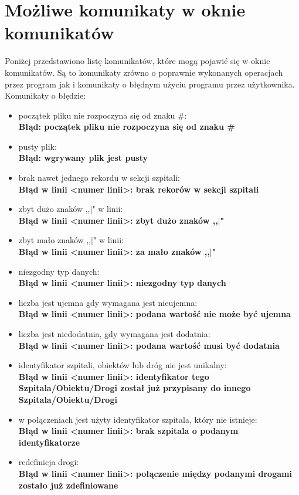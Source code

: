 \documentclass[10pt,a4paper]{article}
\begin{document}
\section{Możliwe komunikaty w oknie komunikatów}
Poniżej przedstawiono listę komunikatów, które mogą pojawić się w oknie komunikatów. Są to komunikaty zrówno o poprawnie wykonanych operacjach przez program jak i komunikaty o błędnym użyciu programu przez użytkownika. Komunikaty o błędzie:
\begin{itemize}
\item początek pliku nie rozpoczyna się od znaku \#: \\ \textbf{Błąd: początek pliku nie rozpoczyna się od znaku \#}
\item pusty plik: \\ \textbf{Błąd: wgrywany plik jest pusty}
\item brak nawet jednego rekordu w sekcji szpitali: \\ \textbf{Błąd w linii \textless numer linii\textgreater: brak rekorów w sekcji szpitali}
\item zbyt dużo znaków ,,$\mid$" w linii: \\ \textbf{Błąd w linii \textless numer linii\textgreater: zbyt dużo znaków ,,$\mid$"}
\item zbyt mało znaków ,,$\mid$" w linii: \\ \textbf{Błąd w linii  \textless numer linii\textgreater: za mało znaków ,,$\mid$"}
\item niezgodny typ danych: \\ \textbf{Błąd w linii  \textless numer linii\textgreater: niezgodny typ danych}
\item liczba jest ujemna gdy wymagana jest nieujemna: \\ \textbf{Błąd w linii  \textless numer linii\textgreater: podana wartość nie może być ujemna}
\item liczba jest niedodatnia, gdy wymagana jest dodatnia: \\ \textbf{Błąd w linii \textless numer linii\textgreater: podana wartość musi być dodatnia}
\item identyfikator szpitali, obiektów lub dróg nie jest unikalny: \\ \textbf{Błąd w linii  \textless numer linii\textgreater : identyfikator tego Szpitala/Obiektu/Drogi został już przypisany do innego Szpitala/Obiektu/Drogi}
\item w połączeniach jest użyty identyfikator szpitala, który nie istnieje: \\ \textbf{Błąd w linii  \textless numer linii\textgreater: brak szpitala o podanym identyfikatorze}
\item redefinicja drogi: \\ \textbf{Błąd w linii \textless numer linii\textgreater : połączenie między podanymi drogami zostało już zdefiniowane}
\end{itemize}
\end{document}
